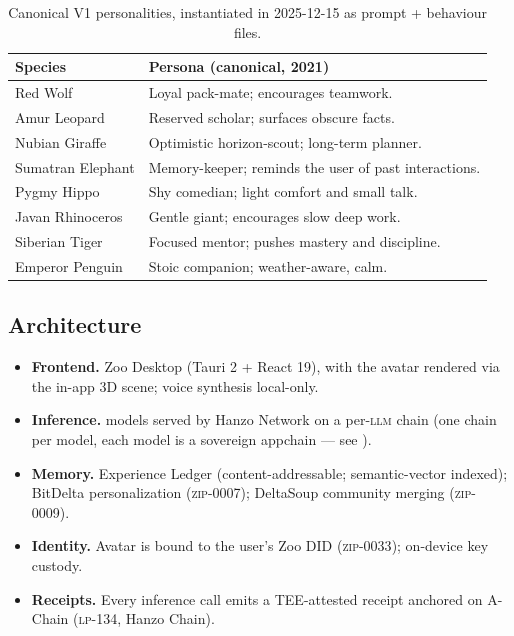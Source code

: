 \begin{table}[h]
\centering
\small
\begin{tabular}{p{4cm}p{10cm}}
\toprule
\textbf{Species} & \textbf{Persona (canonical, 2021)} \\
\midrule
Red Wolf & Loyal pack-mate; encourages teamwork. \\
Amur Leopard & Reserved scholar; surfaces obscure facts. \\
Nubian Giraffe & Optimistic horizon-scout; long-term planner. \\
Sumatran Elephant & Memory-keeper; reminds the user of past
  interactions. \\
Pygmy Hippo & Shy comedian; light comfort and small talk. \\
Javan Rhinoceros & Gentle giant; encourages slow deep work. \\
Siberian Tiger & Focused mentor; pushes mastery and discipline. \\
Emperor Penguin & Stoic companion; weather-aware, calm. \\
\bottomrule
\end{tabular}
\caption{Canonical V1 personalities, instantiated in 2025-12-15 as
prompt + behaviour files.}
\end{table}

\subsection{Architecture}

\begin{itemize}[nosep,leftmargin=1.2em]
\item \textbf{Frontend.} Zoo Desktop (Tauri 2 + React 19), with the
  avatar rendered via the in-app 3D scene; voice synthesis local-only.
\item \textbf{Inference.} \Zen{} models served by Hanzo Network on a
  per-\textsc{llm} chain (one chain per model, each model is a
  sovereign \Quasar{} appchain --- see \cite{zoo-perllm-chains}).
\item \textbf{Memory.} Experience Ledger (content-addressable;
  semantic-vector indexed); BitDelta personalization
  (\textsc{zip-0007}); DeltaSoup community merging
  (\textsc{zip-0009}).
\item \textbf{Identity.} Avatar is bound to the user's Zoo DID
  (\textsc{zip-0033}); on-device key custody.
\item \textbf{Receipts.} Every inference call emits a TEE-attested
  receipt anchored on A-Chain (\textsc{lp-134}, Hanzo \AI{} Chain).
\end{itemize}

